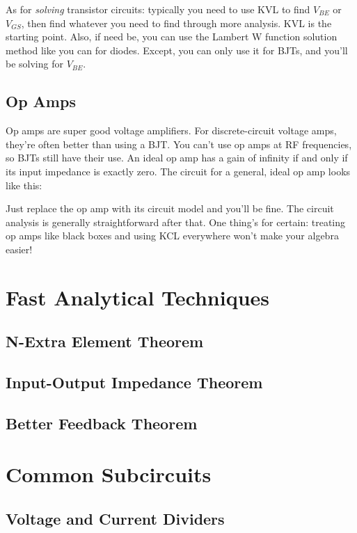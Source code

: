 As for \textit{solving} transistor circuits: typically you need to use KVL to find $V_{BE}$ or $V_{GS}$, then find whatever you need to find through more analysis. KVL is the starting point. Also, if need be, you can use the Lambert W function solution method like you can for diodes. Except, you can only use it for BJTs, and you'll be solving for $V_{BE}$.
\subsection{Op Amps}
Op amps are super good voltage amplifiers. For discrete-circuit voltage amps, they're often better than using a BJT. You can't use op amps at RF frequencies, so BJTs still have their use. An ideal op amp has a gain of infinity if and only if its input impedance is exactly zero.
The circuit for a general, ideal op amp looks like this:

Just replace the op amp with its circuit model and you'll be fine. The circuit analysis is generally straightforward after that. One thing's for certain: treating op amps like black boxes and using KCL everywhere won't make your algebra easier!

\section{Fast Analytical Techniques}
\subsection{N-Extra Element Theorem}
\subsection{Input-Output Impedance Theorem}
\subsection{Better Feedback Theorem}
\section{Common Subcircuits}
\subsection{Voltage and Current Dividers}

